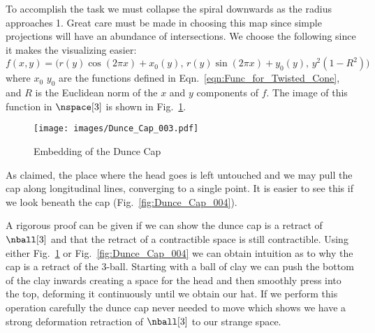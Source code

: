         \par\vspace{2.5ex}
        To accomplish the task we must collapse the spiral downwards as
        the radius approaches 1. Great care must be made in choosing
        this map since simple projections will have an abundance of
        intersections. We choose the following since it makes the
        visualizing easier:
        \begin{equation}
            f(x,y)=\big(
                r(y)\cos(2\pi{x})+x_{0}(y),\,
                r(y)\sin(2\pi{x})+y_{0}(y),\,
                y^{2}(1-R^{2})
            \big)
        \end{equation}
        where $x_{0}$ $y_{0}$ are the functions defined in
        Eqn.~\ref{eqn:Func_for_Twisted_Cone}, and $R$ is the Euclidean
        norm of the $x$ and $y$ components of $f$. The image of this
        function in $\nspace[3]$ is shown in
        Fig.~\ref{fig:Dunce_Cap_003}.
        \begin{figure}
            \centering
            \captionsetup{type=figure}
            \texttt{[image: images/Dunce\_Cap\_003.pdf]}
            \caption{Embedding of the Dunce Cap}
            \label{fig:Dunce_Cap_003}
        \end{figure}
        As claimed, the place where the head goes is left untouched and
        we may pull the cap along longitudinal lines, converging to a
        single point. It is easier to see this if we look beneath the
        cap (Fig.~\ref{fig:Dunce_Cap_004}).
        \par\hfill\par
        \hfill
        \begin{minipage}[c]{0.54\textwidth}
            A rigorous proof can be given if we can show the dunce cap
            is a retract of $\nball[3]$ and that the retract of a
            contractible space is still contractible. Using either
            Fig.~\ref{fig:Dunce_Cap_003} or Fig.~\ref{fig:Dunce_Cap_004}
            we can obtain intuition as to why the cap is a retract of
            the 3-ball. Starting with a ball of clay we can push the
            bottom of the clay inwards creating a space for the head and
            then smoothly press into the top, deforming it
            continuously until we obtain our hat. If we perform this
            operation carefully the dunce cap never needed to move
            which shows we have a strong deformation retraction of
            $\nball[3]$ to our strange space.
        \end{minipage}
